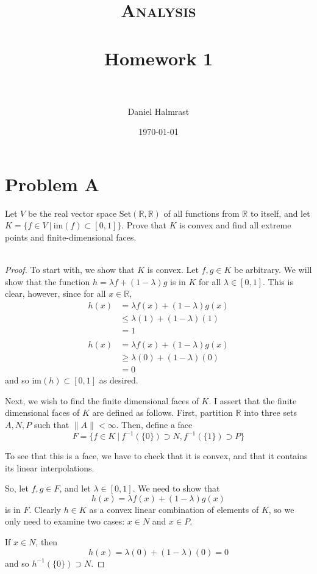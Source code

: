 \documentclass[fontsize=11pt]{scrartcl} %
\title{	
\normalfont \normalsize 
\textsc{Analysis} \\ [25pt] %
\horrule{0.5pt} \\[0.4cm] %
\huge Homework 1 \\ %
\horrule{2pt} \\[0.5cm] %
}
\author{Daniel Halmrast} %
\date{\normalsize\today} %
\numberwithin{equation}{section} %
\numberwithin{figure}{section} %
\numberwithin{table}{section} %
\newcommand{\R}{\mathbb{R}}
\newcommand{\im}{\textrm{im}}
\begin{document}
\maketitle %


\section*{Problem A}
Let $V$ be the real vector space $\text{Set}(\R,\R)$ of all functions from $\R$
to itself, and let $K = \{f\in V\ |\ \im(f)\subset[0,1]\}$. Prove that $K$ is
convex and find all extreme points and finite-dimensional faces.
\\
\\
\begin{proof}
    To start with, we show that $K$ is convex. Let $f,g\in K$ be arbitrary. We
    will show that the function $h=\lambda f + (1-\lambda)g$ is in $K$ for all
    $\lambda\in [0,1]$. This is clear, however, since for all $x\in \R$,
    \[
        \begin{aligned}
        h(x) &=\lambda f(x) + (1-\lambda)g(x)\\
        &\leq \lambda(1)+ (1-\lambda)(1)\\
        &= 1\\
        \\
        h(x) &=\lambda f(x) + (1-\lambda)g(x)\\
        &\geq \lambda (0) + (1-\lambda)(0)\\
        &=0
    \end{aligned}
    \]
    and so $\im(h)\subset [0,1]$ as desired.

    Next, we wish to find the finite dimensional faces of $K$. I assert that the
    finite dimensional faces of $K$ are defined as follows. First, partition
    $\R$ into three sets $A,N,P$ such that $\|A\|<\infty$. Then, define a face
    \[
        F = \{f\in K\ |\ f^{-1}(\{0\})\supset N, f^{-1}(\{1\})\supset P\}
    \]

    To see that this is a face, we have to check that it is convex, and that it
    contains its linear interpolations.

    So, let $f,g\in F$, and let $\lambda\in [0,1]$. We need to show that
    \[
        h(x) = \lambda f(x) + (1-\lambda)g(x)
    \]
    is in $F$. Clearly $h\in K$ as a convex linear combination of elements of
    $K$, so we only need to examine two cases: $x\in N$ and $x\in P$.

    If $x\in N$, then
    \[
        h(x) = \lambda (0) + (1-\lambda)(0) = 0
    \]
    and so $h^{-1}(\{0\})\supset N$.


\end{proof}
\end{document}
